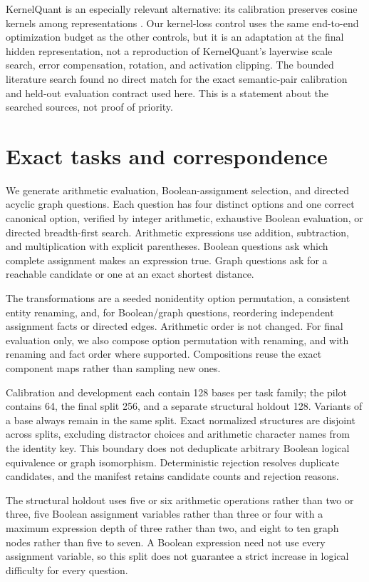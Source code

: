 \documentclass[11pt]{article}
\begin{document}
KernelQuant is an especially relevant alternative: its calibration preserves
cosine kernels among representations \cite{kernelquant}. Our kernel-loss
control uses the same end-to-end optimization budget as the other controls,
but it is an adaptation at the final hidden representation, not a
reproduction of KernelQuant's layerwise scale search, error compensation,
rotation, and activation clipping. The bounded literature search found no
direct match for the exact semantic-pair calibration and held-out evaluation
contract used here. This is a statement about the searched sources, not
proof of priority.

\section{Exact tasks and correspondence}
We generate arithmetic evaluation, Boolean-assignment selection, and directed
acyclic graph questions. Each question has four distinct options and one
correct canonical option, verified by integer arithmetic, exhaustive Boolean
evaluation, or directed breadth-first search. Arithmetic expressions use
addition, subtraction, and multiplication with explicit parentheses. Boolean
questions ask which complete assignment makes an expression true. Graph
questions ask for a reachable candidate or one at an exact shortest distance.

The transformations are a seeded nonidentity option permutation, a consistent
entity renaming, and, for Boolean/graph questions, reordering independent
assignment facts or directed edges. Arithmetic order is not changed.
For final evaluation only, we also compose option permutation with renaming,
and with renaming and fact order where supported. Compositions reuse the
exact component maps rather than sampling new ones.

Calibration and development each contain 128 bases per task family; the
pilot contains 64, the final split 256, and a separate structural holdout 128.
Variants of a base always remain in the same split. Exact normalized
structures are disjoint across splits, excluding distractor choices and
arithmetic character names from the identity key. This boundary does not
deduplicate arbitrary Boolean logical equivalence or graph isomorphism.
Deterministic rejection resolves duplicate candidates, and the manifest
retains candidate counts and rejection reasons.

The structural holdout uses five or six arithmetic operations rather than
two or three, five Boolean assignment variables rather than three or four
with a maximum expression depth of three rather than two, and eight to ten
graph nodes rather than five to seven. A Boolean expression need not use
every assignment variable, so this split does not guarantee a strict
increase in logical difficulty for every question.
\end{document}

